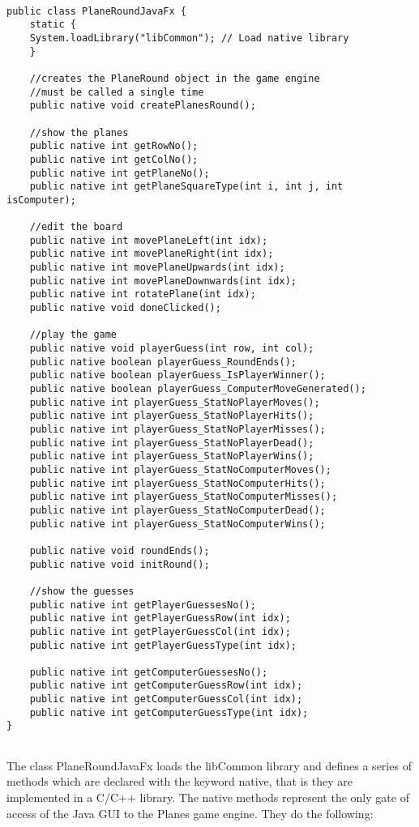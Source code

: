 \begin{lstlisting} 

public class PlaneRoundJavaFx {
	static {
	System.loadLibrary("libCommon"); // Load native library 
	}
	
	//creates the PlaneRound object in the game engine
	//must be called a single time	
	public native void createPlanesRound(); 
	
	//show the planes
	public native int getRowNo();
	public native int getColNo();
	public native int getPlaneNo();
	public native int getPlaneSquareType(int i, int j, int isComputer);
	
	//edit the board
	public native int movePlaneLeft(int idx);
	public native int movePlaneRight(int idx);
	public native int movePlaneUpwards(int idx);
	public native int movePlaneDownwards(int idx);
	public native int rotatePlane(int idx);
	public native void doneClicked();
	
	//play the game
	public native void playerGuess(int row, int col);
	public native boolean playerGuess_RoundEnds();
	public native boolean playerGuess_IsPlayerWinner();
	public native boolean playerGuess_ComputerMoveGenerated();
	public native int playerGuess_StatNoPlayerMoves();
	public native int playerGuess_StatNoPlayerHits();
	public native int playerGuess_StatNoPlayerMisses();
	public native int playerGuess_StatNoPlayerDead();
	public native int playerGuess_StatNoPlayerWins();
	public native int playerGuess_StatNoComputerMoves();
	public native int playerGuess_StatNoComputerHits();
	public native int playerGuess_StatNoComputerMisses();
	public native int playerGuess_StatNoComputerDead();
	public native int playerGuess_StatNoComputerWins();
	
	public native void roundEnds();
	public native void initRound();
	
	//show the guesses
	public native int getPlayerGuessesNo();
	public native int getPlayerGuessRow(int idx);
	public native int getPlayerGuessCol(int idx);
	public native int getPlayerGuessType(int idx);
	
	public native int getComputerGuessesNo();
	public native int getComputerGuessRow(int idx);
	public native int getComputerGuessCol(int idx);
	public native int getComputerGuessType(int idx);	
}


\end{lstlisting}

The class PlaneRoundJavaFx loads the libCommon library and defines a series of methods which are declared with the keyword native, that is they are implemented in a C/C++ library. The native methods represent the only gate of access of the Java GUI to the Planes game engine. They do the following:

